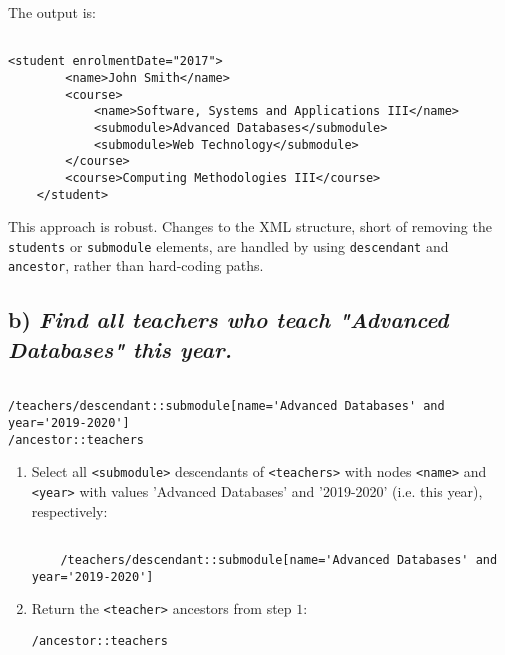 \documentclass[11pt]{article} %
\begin{document}
The output is:

\begin{verbatim}

<student enrolmentDate="2017">
        <name>John Smith</name>
        <course>
            <name>Software, Systems and Applications III</name>
            <submodule>Advanced Databases</submodule>
            <submodule>Web Technology</submodule>
        </course>
        <course>Computing Methodologies III</course>
    </student>

\end{verbatim}

This approach is robust. Changes to the XML structure, short of removing the \verb|students| or \verb|submodule| elements, are handled by using \verb|descendant| and \verb|ancestor|, rather than hard-coding paths.

\clearpage

\subsection*{b) \textit{Find all teachers who teach "Advanced Databases" this year.}}

\begin{verbatim}

/teachers/descendant::submodule[name='Advanced Databases' and year='2019-2020']
/ancestor::teachers

\end{verbatim}

\begin{enumerate}

	\item{Select all \verb|<submodule>| descendants of \verb|<teachers>| with nodes \verb|<name>| and \verb|<year>| with values 'Advanced Databases' and '2019-2020' (i.e. this year), respectively:} 

\begin{verbatim}

	/teachers/descendant::submodule[name='Advanced Databases' and year='2019-2020']

\end{verbatim}

	\item{Return the \verb|<teacher>| ancestors from step $1$:}

\begin{center}

	\verb|/ancestor::teachers|

\end{center}

\end{enumerate}
\end{document}
